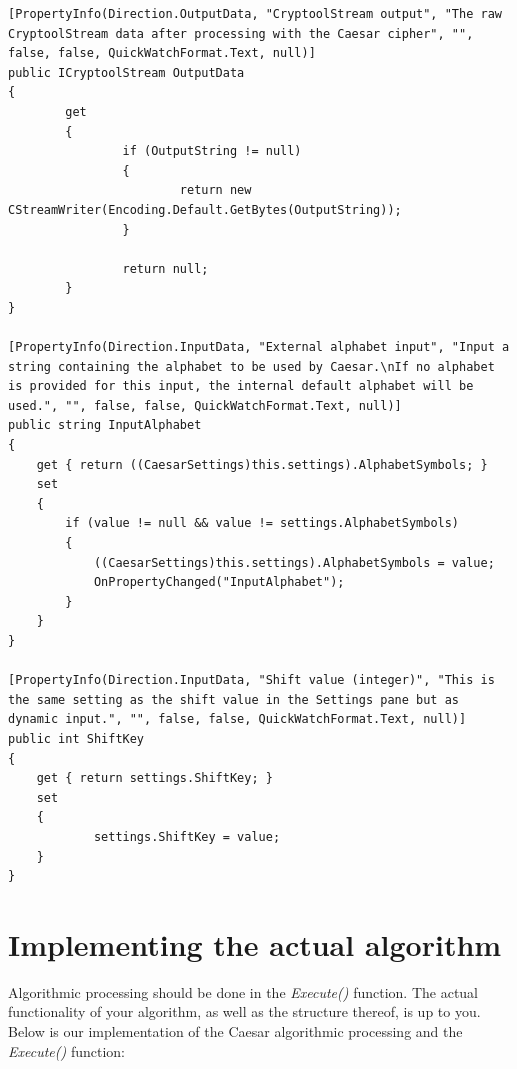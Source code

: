 \begin{lstlisting}
[PropertyInfo(Direction.OutputData, "CryptoolStream output", "The raw CryptoolStream data after processing with the Caesar cipher", "", false, false, QuickWatchFormat.Text, null)]
public ICryptoolStream OutputData
{
		get
		{
				if (OutputString != null)
				{                    
						return new CStreamWriter(Encoding.Default.GetBytes(OutputString));
				}

				return null;
		}
}

[PropertyInfo(Direction.InputData, "External alphabet input", "Input a string containing the alphabet to be used by Caesar.\nIf no alphabet is provided for this input, the internal default alphabet will be used.", "", false, false, QuickWatchFormat.Text, null)]
public string InputAlphabet
{
	get { return ((CaesarSettings)this.settings).AlphabetSymbols; }
	set
	{
		if (value != null && value != settings.AlphabetSymbols)
		{
			((CaesarSettings)this.settings).AlphabetSymbols = value;
			OnPropertyChanged("InputAlphabet");
		}
	}
}

[PropertyInfo(Direction.InputData, "Shift value (integer)", "This is the same setting as the shift value in the Settings pane but as dynamic input.", "", false, false, QuickWatchFormat.Text, null)]
public int ShiftKey
{
	get { return settings.ShiftKey; }
	set
	{
			settings.ShiftKey = value;
	}
}
\end{lstlisting}

\section{Implementing the actual algorithm}
\label{sec:ImplementingTheActualAlgorithm}

Algorithmic processing should be done in the \textit{Execute()} function. The actual functionality of your algorithm, as well as the structure thereof, is up to you. Below is our implementation of the Caesar algorithmic processing and the \textit{Execute()} function:

